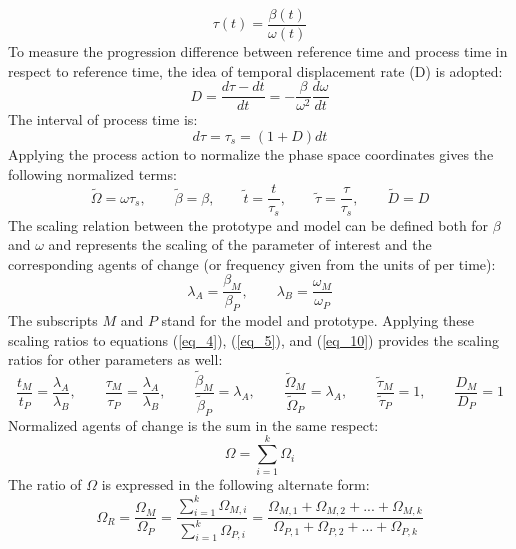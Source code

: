 \begin{equation}
  \label{eq_4}
  \tau(t)=\frac{\beta(t)}{\omega(t)}
\end{equation}
To measure the progression difference between reference time and process time in respect to reference time, the idea of temporal displacement rate (D) is adopted:
\begin{equation}
  \label{eq_5}
  D=\frac{d\tau-dt}{dt}=-\frac{\beta}{\omega^{2}}\frac{d\omega}{dt}
\end{equation}
The interval of process time is:
\begin{equation}
  \label{eq_8}
  d\tau=\tau_{s}=\left(1+D\right)dt
\end{equation}
Applying the process action to normalize the phase space coordinates gives the following normalized terms:
\begin{equation}
  \label{eq_10}
  \tilde{\Omega}=\omega\tau_{s},\qquad \tilde{\beta}=\beta,\qquad \tilde{t}=\frac{t}{\tau_{s}},\qquad \tilde{\tau}=\frac{\tau}{\tau_{s}},\qquad
  \tilde{D}=D
\end{equation}
The scaling relation between the prototype and model can be defined both for $\beta$ and $\omega$ and represents the scaling of the parameter of interest and the corresponding agents of change (or frequency given from the units of per time):
\begin{equation}
  \label{eq_11}
  \lambda_{A}=\frac{\beta_{M}}{\beta_{P}},\qquad \lambda_{B}=\frac{\omega_{M}}{\omega_{P}}
\end{equation}
The subscripts $M$ and $P$ stand for the model and prototype. Applying these scaling ratios to equations (\ref{eq_4}), (\ref{eq_5}), and (\ref{eq_10}) provides the scaling ratios for other parameters as well:
\begin{equation}
  \label{eq_12}
  \frac{t_{M}}{t_{P}}=\frac{\lambda_{A}}{\lambda_{B}},\qquad \frac{\tau_{M}}{\tau_{P}}=\frac{\lambda_{A}}{\lambda_{B}},\qquad \frac{\tilde{\beta}_{M}}{\tilde{\beta}_{P}}=\lambda_{A},\qquad \frac{\tilde{\Omega}_{M}}{\tilde{\Omega}_{P}}=\lambda_{A},\qquad \frac{\tilde{\tau}_{M}}{\tilde{\tau}_{P}}=1,\qquad \frac{D_{M}}{D_{P}}=1
\end{equation}
Normalized agents of change is the sum in the same respect:
\begin{equation}
  \label{eq_18}
  \Omega=\sum^{k}_{i=1}{\Omega_{i}}
\end{equation}
The ratio of $\Omega$ is expressed in the following alternate form:
\begin{equation}
  \label{eq_19}
  \Omega_{R}=\frac{\Omega_{M}}{\Omega_{P}}=\frac{\sum^{k}_{i=1}{\Omega_{M,i}}}{\sum^{k}_{i=1}{\Omega_{P,i}}}=\frac{\Omega_{M,1}+\Omega_{M,2}+...+\Omega_{M,k}}{\Omega_{P,1}+\Omega_{P,2}+...+\Omega_{P,k}}
\end{equation}
